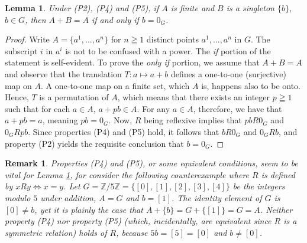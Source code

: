\documentclass[pdflatex,sn-apa,11pt]{sn-jnl}%
\newtheorem{remark}{Remark}%
\newtheorem{lemma}{Lemma}
\begin{document}
\begin{lemma}
\label{lem2}
Under (P2), (P4) and (P5), if $A$ is finite and $B$ is a singleton $\{b\}$, $b \in G$, then $A+B = A$ if and only if $b = 0_{G}$. 
\end{lemma}

\begin{proof}
Write $A = \{a^1, ..., a^n\}$ for $n \geqq 1$ distinct points $a^1, ..., a^n$ in $G$. The subscript $i$ in $a^i$ is not to be confused with a power. The \textit{if} portion of the statement is self-evident. To prove the \textit{only if} portion, we assume that $A+B = A$ and observe that the translation $T: a \mapsto a+b$ defines a one-to-one (surjective) map on $A$. A one-to-one map on a finite set, which $A$ is, happens also to be onto. Hence, $T$ is a permutation of $A$, which means that there exists an integer $p \geqq 1$ such that for each $a \in A$, $a + pb \in A$. For any $a \in A$, therefore, we have that $a + pb = a$, meaning $pb = 0_{G}$. Now, $R$ being reflexive implies that $pbR0_{G}$ and $0_{G}Rpb$. Since properties (P4) and (P5) hold, it follows that $bR0_{G}$ and $0_{G}Rb$, and property (P2) yields the requisite conclusion that $b = 0_{G}$.   

\end{proof}

\begin{remark}
\label{rem_revision_1}
Properties (P4) and (P5), or some equivalent conditions, seem to be vital for Lemma \ref{lem2}, for consider the following counterexample where $R$ is defined by $xRy \iff x=y$. Let $G = \mathbb{Z}/5\mathbb{Z} = \{[0],[1],[2],[3],[4]\}$ be the integers modulo $5$ under addition, $A = G$ and $b = [1]$. The identity element of $G$ is $[0] \neq b$, yet it is plainly the case that $A+\{b\} = G + \{[1]\} = G = A$. Neither property (P4) nor property (P5) (which, incidentally, are equivalent since $R$ is a symmetric relation) holds of $R$, because $5b = [5] = [0]$ and $b\neq [0]$.  

\end{remark}
\end{document}
